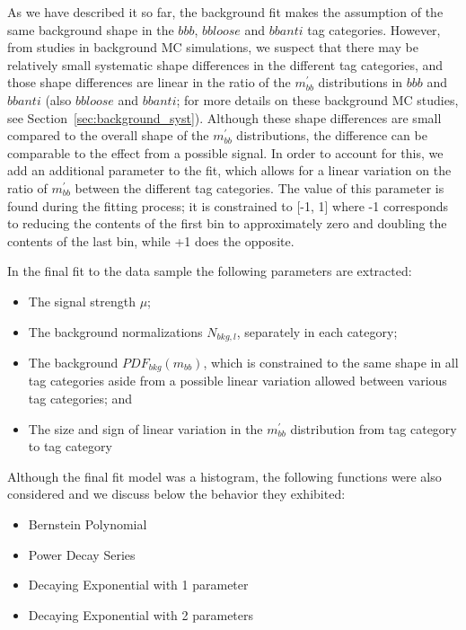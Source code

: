 As we have described it so far, the background fit makes the assumption of the
same background shape in the $bbb$, $bbloose$ and $bbanti$ tag categories.
However, from studies in background MC simulations, we suspect that there may 
be relatively small systematic shape differences in the different tag
categories, and those shape differences are linear in the ratio of the $m^{'}_{bb}$
distributions in $bbb$ and $bbanti$ (also $bbloose$ and $bbanti$; for more
details on these background MC studies, see Section~\ref{sec:background_syst}).
Although these shape differences are small compared to the overall shape of the
$m^{'}_{bb}$ distributions, the difference can be comparable to the effect from
a possible signal.  In order to account for this, we add an additional parameter
to the fit, which allows for a linear variation on the ratio of $m^{'}_{bb}$
between the different tag categories.  The value of this parameter is found
during the fitting process; it is constrained to [-1, 1] where -1 corresponds to
reducing the contents of the first bin to approximately zero and doubling the contents
of the last bin, while +1 does the opposite.




In the final fit to the data sample the following parameters are extracted:
\begin{itemize}
\item The signal strength $\mu$;
\item The background normalizations $N_{bkg,l}$, separately in each category;
\item The background $PDF_{bkg}(m_{bb})$, which is constrained to the same shape in all
tag categories aside from a possible linear variation allowed between various tag categories; and
\item The size and sign of linear variation in the $m^{'}_{bb}$ distribution from tag category to tag category 
\end{itemize} 


Although the final fit model was a histogram, the following functions were
also considered and we discuss below the behavior they exhibited:
\begin{itemize}
    \item Bernstein Polynomial
    \item Power Decay Series
    \item Decaying Exponential with 1 parameter
    \item Decaying Exponential with 2 parameters
\end{itemize}


